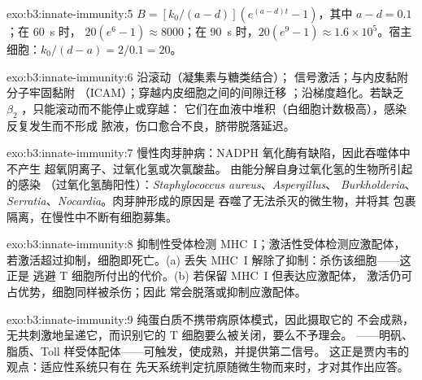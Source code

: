\begin{solution}{exo:b3:innate-immunity:5}
$B = [k_{0}/(a-d)](e^{(a-d)t} - 1)$，其中 $a - d = 0.1$；在 \qty{60}{s} 时，
$20(e^{6} - 1) \approx 8000$；在 \qty{90}{s} 时，$20(e^{9} - 1) \approx
1.6\times 10^{5}$。宿主细胞：$k_{0}/(d - a) = 2/0.1 = 20$。
\end{solution}

\begin{solution}{exo:b3:innate-immunity:6}
沿滚动（凝集素与糖类结合）；
信号激活；与内皮黏附分子牢固黏附
（ICAM）；穿越内皮细胞之间的间隙迁移
；沿梯度趋化。若缺乏
$\beta_{2}$ ，只能滚动而不能停止或穿越：
它们在血液中堆积（白细胞计数极高），感染反复发生而不形成
脓液，伤口愈合不良，脐带脱落延迟。
\end{solution}

\begin{solution}{exo:b3:innate-immunity:7}
慢性肉芽肿病：NADPH 氧化酶有缺陷，因此吞噬体中不产生
超氧阴离子、过氧化氢或次氯酸盐。
由能分解自身过氧化氢的生物所引起的感染
（过氧化氢酶阳性）：\emph{Staphylococcus aureus}、\emph{Aspergillus}、
\emph{Burkholderia}、\emph{Serratia}、\emph{Nocardia}。肉芽肿形成的原因是
吞噬了无法杀灭的微生物，并将其
包裹隔离，在慢性中不断有细胞募集。
\end{solution}

\begin{solution}{exo:b3:innate-immunity:8}
抑制性受体检测 MHC~I；激活性受体检测应激配体，
若激活超过抑制，细胞即死亡。(a) 丢失
MHC~I 解除了抑制：杀伤该细胞——这正是
逃避 T 细胞所付出的代价。(b) 若保留 MHC~I 但表达应激配体，
激活仍可占优势，细胞同样被杀伤；因此
常会脱落或抑制应激配体。
\end{solution}

\begin{solution}{exo:b3:innate-immunity:9}
纯蛋白质不携带病原体模式，因此摄取它的
不会成熟，无共刺激地呈递它，而识别它的
T 细胞要么被关闭，要么不予理会。
——明矾、脂质、Toll 样受体配体——可触发，使成熟，并提供第二信号。
这正是贾内韦的观点：适应性系统只有在
先天系统判定抗原随微生物而来时，才对其作出应答。
\end{solution}

